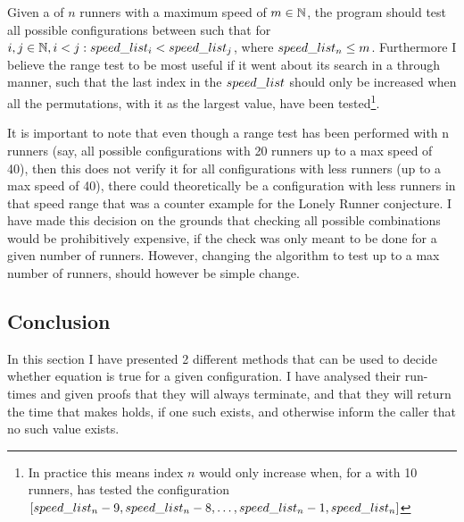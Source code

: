 Given a \comS of $n$ runners with a maximum speed of $m \in \mathbb{N}$, the program should test all possible configurations between such that for $i, j \in \mathbb{N}, i < j: speed\_list_i < speed\_list_j$, where $speed\_list_n \leq m$. Furthermore I believe the range test to be most useful if it went about its search in a through manner, such that the last index in the $speed\_list$ should only be increased when all the permutations, with it as the largest value, have been tested\footnote{In practice this means index $n$ would only increase when, for a \comS with 10 runners, has tested the configuration $[speed\_list_n - 9, speed\_list_n - 8, \ldots, speed\_list_n - 1, speed\_list_n]$}. 

It is important to note that even though a range test has been performed with n runners (say, all possible configurations with 20 runners up to a max speed of 40), then this does not verify it for all configurations with less runners (up to a max speed of 40), there could theoretically be a configuration with less runners in that speed range that was a counter example for the Lonely Runner conjecture. I have made this decision on the grounds that checking all possible combinations would be prohibitively expensive, if the check was only meant to be done for a given number of runners. However, changing the algorithm to test up to a max number of runners, should however be simple change. 


\subsection{Conclusion}
In this section I have presented 2 different methods that can be used to decide whether equation  is true for a given configuration. I have analysed their run-times and given proofs that they will always terminate, and that they will return the time that makes  holds, if one such exists, and otherwise inform the caller that no such value exists.
